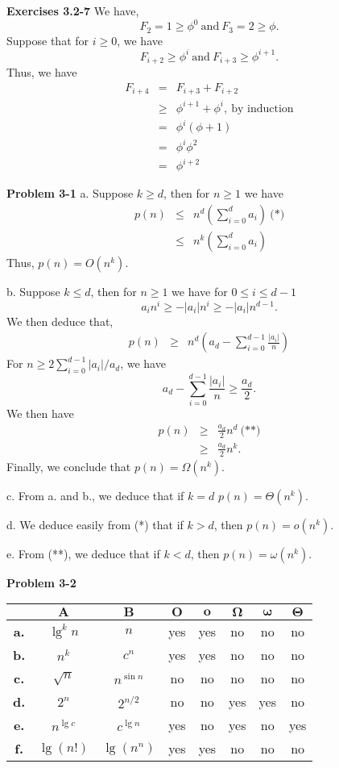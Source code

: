 \documentclass[a4paper,12pt]{article}
\newcommand{\newpar}[1]
{\bigskip \noindent \textbf{Exercises #1} \newline}
\newcommand{\newprob}[1]
{\bigskip \noindent \textbf{Problem #1} \newline}
\begin{document}
\newpar{3.2-7}
We have,
\[ F_2 = 1 \ge \phi^0\ \mbox{and}\ F_3 = 2 \ge \phi.\]
Suppose that for $i \ge 0$, we have
\[ F_{i+2} \ge \phi^i\ \mbox{and}\ F_{i+3} \ge \phi^{i+1}.\]
Thus, we have
\begin{eqnarray*}
F_{i+4} &=& F_{i+3} + F_{i+2} \\
&\ge& \phi^{i+1} + \phi^i,\ \mbox{by induction} \\
&=& \phi^i(\phi+1) \\
&=& \phi^i\phi^2\\
&=& \phi^{i+2}
\end{eqnarray*}

\newprob{3-1}
a. Suppose $k \ge d$, then for $n \ge 1$ we have
\begin{eqnarray*}
p(n) &\le& n^d\left(\sum_{i=0}^da_i\right)\ \mbox{(*)}\\
&\le& n^k \left(\sum_{i=0}^da_i\right)
\end{eqnarray*}
Thus, $p(n) = O(n^k)$.

\medskip \noindent b. Suppose $k \le d$, then for $n \ge 1$ we have
for $0 \le i \le d-1$
\[ a_i n^i \ge - |a_i| n^i \ge -|a_i| n^{d-1}.\]
We then deduce that,
\begin{eqnarray*}
p(n) &\ge& n^d\left(a_d - \sum_{i=0}^{d-1} \frac{|a_i|}{n}\right)
\end{eqnarray*}
For $n \ge 2 \sum_{i=0}^{d-1}|a_i|/a_d$, we have
\[a_d - \sum_{i=0}^{d-1} \frac{|a_i|}{n} \ge \frac{a_d}{2}.\]
We then have
\begin{eqnarray*}
p(n) &\ge& \frac{a_d}{2} n^d\ \mbox{(**)}\\ 
&\ge& \frac{a_d}{2} n^k.
\end{eqnarray*}
Finally, we conclude that $p(n) = \Omega(n^k)$.

\medskip \noindent
c. From a. and b., we deduce that if $k=d$ $p(n) = \Theta(n^k)$.

\medskip \noindent
d. We deduce easily from (*) that if $k > d$, then $p(n) = o(n^k)$.

\medskip \noindent
e. From (**), we deduce that if $k < d$, then $p(n) = \omega(n^k)$.

\newprob{3-2}
\begin{tabular}{|c|c|c|c|c|c|c|c|}
\hline
&$\mathbf{A}$&$\mathbf{B}$&$\mathbf{O}$&$\mathbf{o}$&
$\mathbf{\Omega}$&$\mathbf{\omega}$&$\mathbf{\Theta}$\\ 
\hline
\textbf{a.}&$\lg^kn$&$n$&yes&yes&no&no&no\\ 
\hline
\textbf{b.}&$n^k$&$c^n$&yes&yes&no&no&no\\
\hline
\textbf{c.}&$\sqrt{n}$&$n^{\sin n}$&no&no&no&no&no\\
\hline
\textbf{d.}&$2^n$&$2^{n/2}$&no&no&yes&yes&no\\
\hline
\textbf{e.}&$n^{\lg c}$&$c^{\lg n}$&yes&no&yes&no&yes\\
\hline
\textbf{f.}&$\lg(n!)$&$\lg(n^n)$&yes&yes&no&no&no\\
\hline
\end{tabular}
\end{document}
